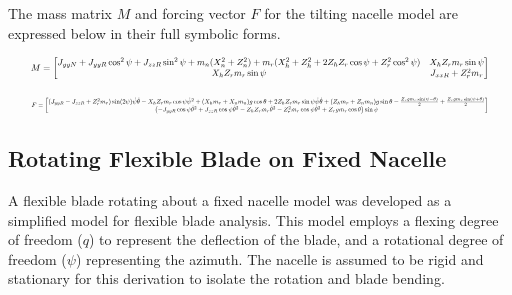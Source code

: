 \documentclass[onecolumn,draftcls]{IEEEtran}
\begin{document}
The mass matrix $M$ and forcing vector $F$ for the tilting nacelle model are expressed below in their full symbolic forms.

\begin{equation}
    \label{eq:tilting_mass_matrix_full}
    \resizebox{0.95\textwidth}{!}{%
    $M = \begin{bmatrix}
        J_{yyN} + J_{yyR} \cos^{2}\psi + J_{zzR} \sin^{2}\psi + m_{n}(X_{n}^{2} + Z_{n}^{2}) + m_{r}(X_{h}^{2} + Z_{h}^{2} + 2 Z_{h} Z_{r} \cos\psi + Z_{r}^{2} \cos^{2}\psi) & X_{h} Z_{r} m_{r} \sin\psi \\
        X_{h} Z_{r} m_{r} \sin\psi & J_{xxR} + Z_{r}^{2} m_{r}
    \end{bmatrix}$%
    }
\end{equation}

\begin{equation} 
    \label{eq:tilting_forcing_terms_full}
    \resizebox{0.95\textwidth}{!}{%
    $F = \begin{bmatrix}
        (J_{yyR} - J_{zzR} + Z_{r}^{2} m_{r}) \sin(2\psi) \dot{\psi} \dot{\theta} - X_{h} Z_{r} m_{r} \cos\psi \dot{\psi}^{2} + (X_{h} m_{r} + X_{n} m_{n}) g \cos\theta + 2 Z_{h} Z_{r} m_{r} \sin\psi \dot{\psi} \dot{\theta} + (Z_{h} m_{r} + Z_{n} m_{n}) g \sin\theta - \frac{Z_{r} g m_{r} \sin(\psi - \theta)}{2} + \frac{Z_{r} g m_{r} \sin(\psi + \theta)}{2} \\
        \left(- J_{yyR} \cos\psi \dot{\theta}^{2} + J_{zzR} \cos\psi \dot{\theta}^{2} - Z_{h} Z_{r} m_{r} \dot{\theta}^{2} - Z_{r}^{2} m_{r} \cos\psi \dot{\theta}^{2} + Z_{r} g m_{r} \cos\theta \right) \sin\psi
    \end{bmatrix}$%
    }
\end{equation}

\subsection*{Rotating Flexible Blade on Fixed Nacelle}
A flexible blade rotating about a fixed nacelle model was developed as a simplified model for flexible blade analysis. This model employs a flexing degree of freedom ($q$) to represent the deflection of the blade, and a rotational degree of freedom ($\psi$) representing the azimuth. The nacelle is assumed to be rigid and stationary for this derivation to isolate the rotation and blade bending.
\end{document}
